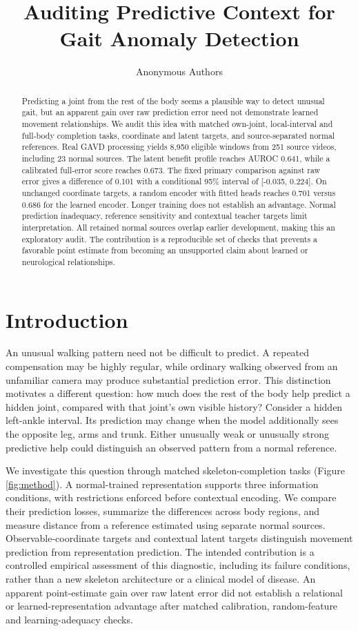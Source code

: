 \documentclass[letterpaper]{article}
\title{Auditing Predictive Context for Gait Anomaly Detection}
\author{Anonymous Authors}
\begin{document}
\maketitle
\begin{abstract}
Predicting a joint from the rest of the body seems a plausible way to detect unusual gait, but an apparent gain over raw prediction error need not demonstrate learned movement relationships. We audit this idea with matched own-joint, local-interval and full-body completion tasks, coordinate and latent targets, and source-separated normal references. Real GAVD processing yields 8,950 eligible windows from 251 source videos, including 23 normal sources. The latent benefit profile reaches AUROC 0.641, while a calibrated full-error score reaches 0.673. The fixed primary comparison against raw error gives a difference of 0.101 with a conditional 95\% interval of {[}-0.035, 0.224{]}. On unchanged coordinate targets, a random encoder with fitted heads reaches 0.701 versus 0.686 for the learned encoder. Longer training does not establish an advantage. Normal prediction inadequacy, reference sensitivity and contextual teacher targets limit interpretation. All retained normal sources overlap earlier development, making this an exploratory audit. The contribution is a reproducible set of checks that prevents a favorable point estimate from becoming an unsupported claim about learned or neurological relationships.
\end{abstract}
\section{Introduction}

An unusual walking pattern need not be difficult to predict. A repeated compensation may be highly regular, while ordinary walking observed from an unfamiliar camera may produce substantial prediction error. This distinction motivates a different question: how much does the rest of the body help predict a hidden joint, compared with that joint's own visible history? Consider a hidden left-ankle interval. Its prediction may change when the model additionally sees the opposite leg, arms and trunk. Either unusually weak or unusually strong predictive help could distinguish an observed pattern from a normal reference.

We investigate this question through matched skeleton-completion tasks (Figure \ref{fig:method}). A normal-trained representation supports three information conditions, with restrictions enforced before contextual encoding. We compare their prediction losses, summarize the differences across body regions, and measure distance from a reference estimated using separate normal sources. Observable-coordinate targets and contextual latent targets distinguish movement prediction from representation prediction. The intended contribution is a controlled empirical assessment of this diagnostic, including its failure conditions, rather than a new skeleton architecture or a clinical model of disease. An apparent point-estimate gain over raw latent error did not establish a relational or learned-representation advantage after matched calibration, random-feature and learning-adequacy checks.
\end{document}
